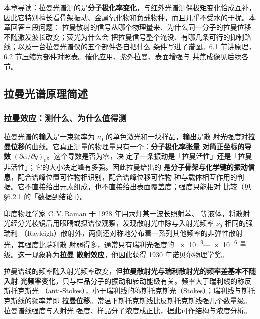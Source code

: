 
%
{本章导读：拉曼光谱测的是\textbf{分子极化率变化}，与红外光谱测偶极矩变化恰成互补，
因此它特别擅长看骨架振动、金属氧化物和负载物种，而且几乎不受水的干扰。本章回答三段问题：
拉曼散射的信号从哪个物理量来、为什么同一分子的拉曼位移不随激发波长改变；荧光为什么会
把拉曼信号整个淹没、有哪几条可行的抑制路线；以及一台拉曼光谱仪的五个部件各自把什么
条件写进了谱图。6.1 节讲原理，6.2 节压缩为部件对照表。催化应用、紫外拉曼、表面增强与
共焦成像见后续各节。}
\label{ch:06}

\subsection{拉曼光谱原理简述}

\subsubsection{拉曼效应：测什么、为什么值得测}

\begin{probout}
拉曼光谱的\textbf{输入}是一束频率为 $\nu_0$ 的单色激光和一块样品，\textbf{输出}是散
射光强度对\textbf{拉曼位移}的曲线。它真正测量的物理量只有一个：\textbf{分子极化率张量
对简正坐标的导数} $\left(\partial \alpha / \partial q\right)_0$。这个导数是否为零，决
定了一条振动是「拉曼活性」还是「拉曼非活性」；它的大小决定峰有多强。因此拉曼给出的
是\textbf{分子骨架与化学键的振动信息}，配合谱峰位置可作物相识别，配合谱峰位移可作物
种与载体相互作用的判据。它不直接给出元素组成，也不直接给出表面覆盖度；强度只能相对
比较（见§6.2.1 的「数据到结论」）。
\end{probout}

印度物理学家 C.\,V.\,Raman 于 1928 年用汞灯某一波长照射苯、 等液体，将散射
光经分光棱镜后用眼睛或摄谱仪观察，发现散射光中除与入射光频率 $\nu_0$ 相同的强瑞利
（Rayleigh）散射外，两侧还对称地分布着一系列其他频率的非弹性散射光，其强度比瑞利散
射弱得多，通常只有瑞利光强度的 \num{e-9}—\num{e-6} 量级。这一现象称为\textbf{拉曼
散射效应}，他因此获得 1930 年诺贝尔物理学奖。

拉曼谱线的频率随入射光频率改变，但\textbf{拉曼散射光与瑞利散射光的频率差基本不随入射
光频率变化}，只与样品分子的振动和转动能级有关。频率大于瑞利线的称反斯托克斯光
（anti-Stokes），小于瑞利线的称斯托克斯光（Stokes）；瑞利线与斯托克斯线的频率差即
\textbf{拉曼位移}。常温下斯托克斯线比反斯托克斯线强几个数量级。拉曼谱线强度与入射光
强度、样品分子浓度成正比，据此可作结构与浓度分析。

